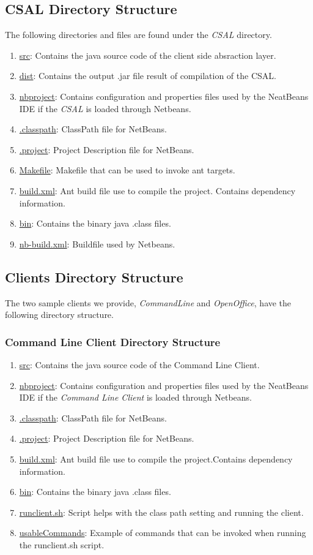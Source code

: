 \subsection{CSAL Directory Structure}
The following directories and files are found under the \emph{CSAL} directory.

\begin{enumerate}
\item \url{src}: Contains the java source code of the client side absraction layer.
\item \url{dist}: Contains the output .jar file result of compilation of the CSAL.
\item \url{nbproject}: Contains configuration and properties files used by the NeatBeans IDE if the \emph{CSAL} is loaded through Netbeans.
\item \url{.classpath}: ClassPath file for NetBeans.
\item \url{.project}: Project Description file for NetBeans.
\item \url{Makefile}: Makefile that can be used to invoke ant targets.
\item \url{build.xml}: Ant build file use to compile the project. Contains dependency information.
\item \url{bin}: Contains the binary java .class files.
\item \url{nb-build.xml}: Buildfile used by Netbeans.
\end{enumerate}


\subsection{Clients Directory Structure}
The two sample clients we provide, \emph{CommandLine} and \emph{OpenOffice}, have the following directory structure.

\subsubsection{Command Line Client Directory Structure}
\begin{enumerate}
\item \url{src}: Contains the java source code of the Command Line Client.
\item \url{nbproject}: Contains configuration and properties files used by the NeatBeans IDE if the \emph{Command Line Client} is loaded through Netbeans.
\item \url{.classpath}: ClassPath file for NetBeans.
\item \url{.project}: Project Description file for NetBeans.
\item \url{build.xml}: Ant build file use to compile the project.Contains dependency information.
\item \url{bin}: Contains the binary java .class files.
\item \url{runclient.sh}: Script helps with the class path setting and running the client.
\item \url{usableCommands}: Example of commands that can be invoked when running the runclient.sh script.
\end{enumerate}

